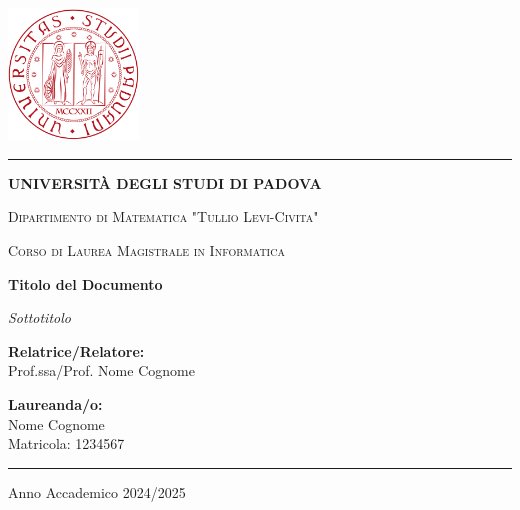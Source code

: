 \documentclass[a4paper,11pt]{report}
\begin{document}
\begin{titlepage}
    \begin{center}
        \vspace*{-1cm}
        \includegraphics[height=3.5cm]{unipd-logo.png}
        
        \vspace{0.5cm}
        {\color{unipd-red}\rule{\textwidth}{1pt}}
        
        \vspace{1cm}
        {\fontsize{20}{24}\selectfont\textcolor{unipd-blue}{\textbf{UNIVERSITÀ DEGLI STUDI DI PADOVA}}}
        
        \vspace{0.5cm}
        {\large\textcolor{unipd-blue}{\textsc{Dipartimento di Matematica "Tullio Levi-Civita"}}}
        
        \vspace{0.5cm}
        {\large\textcolor{unipd-blue}{\textsc{Corso di Laurea Magistrale in Informatica}}}
        
        \vspace{2.5cm}
        {\Huge\textbf{\textcolor{unipd-red}{Titolo del Documento}}}
        
        \vspace{0.5cm}
        {\Large\textit{\textcolor{unipd-blue}{Sottotitolo}}}
        
        \vspace{2cm}
        \begin{minipage}{0.45\textwidth}
            \begin{flushleft}
                {\large\textbf{Relatrice/Relatore:}}\\
                {\large Prof.ssa/Prof. Nome Cognome}
            \end{flushleft}
        \end{minipage}
        \hfill
        \begin{minipage}{0.45\textwidth}
            \begin{flushright}
                {\large\textbf{Laureanda/o:}}\\
                {\large Nome Cognome}\\
                {\large Matricola: 1234567}
            \end{flushright}
        \end{minipage}
        
        \vfill
        {\color{unipd-red}\rule{\textwidth}{1pt}}
        \vspace{0.5cm}
        {\large Anno Accademico 2024/2025}
    \end{center}
\end{titlepage}
\end{document}
